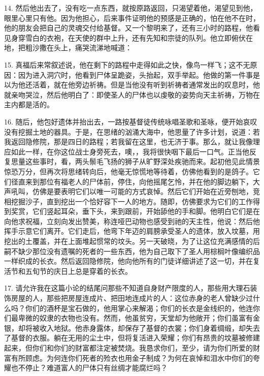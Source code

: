 14. 然后他出去了，没有吃一点东西，就按原路返回，只渴望着他，渴望见到他，眼里心里只有他。因为他担心，后来事件证明他的预感是正确的，怕在他不在时，他的朋友会把自己的灵魂交付给基督。又一个黎明来了，还有三小时的路程，他看见身穿雪白的衣袍，在天使的群中上升，还有先知和宗徒的队列。他立即俯伏在地，把粗沙撒在头上，痛哭流涕地喊道：\par

15. 真福后来常叙述说，他在剩下的路程中走得如此之快，像鸟一样飞；这不无原因：因为进入洞穴时，他看到尸体呈跪姿，头抬起，双手举起。他做的第一件事是以为他还活着，就在他旁边祈祷。但是当他没有听到祈祷者通常发出的叹息时，他就亲吻哭泣，然后他明白了：即使圣人的尸体也以虔敬的姿势向天主祈祷，万物在主内都是活的。\par

16. 随后，他包好遗体并抬出去，一路按基督徒传统咏唱圣歌和圣咏，便开始哀叹没有挖掘土地的器具。于是，在思绪的汹涌大海中，他思量了许多计划，说道：若我返回隐修院，那是四日的路程；若我留在这里，也无济于事。那么，就让我像理应如此一样，在你这位战士身旁死去，噢，，我将很快咽下最后一口气。正当他反复思量这些事时，看，两头鬃毛飞扬的狮子从旷野深处疾驰而来。起初他见此情景惊恐万分，但再次将思绪转向后，他毫无惊慌地等待着，仿佛他看到的是鸽子。它们径直来到那位有福老人的尸体前，停住，向他摇尾乞怜，并在他的脚边躺下，大声吼叫，仿佛是要表明它们以唯一可能的方式哀悼。然后它们开始在近旁刨地，竞相挖掘沙子，直到挖出一个恰好容下一人的地方。随即，仿佛要求为它们的工作得到奖赏，它们竖起耳朵，垂下头，来到跟前，开始舔他的手和脚。他明白它们是在向他求祝福，立刻向发出赞美，称连哑巴动物也感受到祂的天主性，他说：然后他挥手示意它们离开。它们走后，他弯下年迈的肩膀承受圣人的遗体，放入坟墓，用挖出的土覆盖，并在上面堆起惯常的坟头。另一天破晓，为了让这位充满感情的后嗣不缺少那位没有遗嘱的死者的一些东西，他为自己取下了圣人用棕榈叶像编织品一样织成的长衣。然后返回隐修院，他向他所有的门徒详细讲述了这一切，并在复活节和五旬节的庆日上总是穿着的长衣。\par

17. 请允许我在这篇小论的结尾问那些不知道自身财产限度的人，那些用大理石装饰房屋的人，那些把房屋连成片、把田地连成片的人：这位赤身的老人曾缺少过什么吗？你们的酒杯是宝石做的，他用掌心来解渴；你们的长衣是金线织的，他连你们最卑微的奴隶的衣物也没有。然而，他虽贫穷，天堂却为他敞开；你们虽富有金银，却将被收入地狱。他赤身露体，却保存了基督的衣裳；你们身着绸缎，却失去了基督的衣服。躺在无用的尘土中，但将复活进入荣耀；你们有昂贵的坟墓被修建起来，但你们和你们的财富都注定被焚烧。我恳求你们，至少，请为你们所爱的财富有所顾虑。为何连你们死者的殓衣也用金子制成？为何在哀悼和泪水中你们的夸耀也不停止？难道富人的尸体只有丝绸才能腐烂吗？\par

